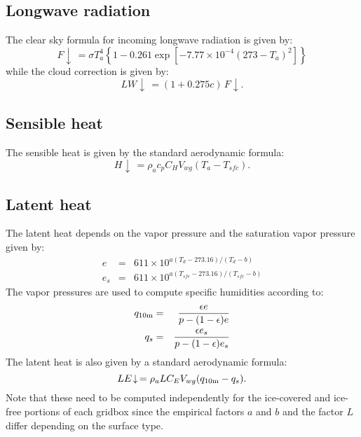 \subsection{Longwave radiation}

The clear sky formula for incoming longwave radiation is given by:
\begin{equation}
   F\!\downarrow\, = \sigma T_a^4 \left\{1 - 0.261 \exp \left[ -7.77 \times 10^{-4}
   (273 - T_a) ^2 \right] \right\}
\end{equation}
while the cloud correction is given by:
\begin{equation}
   LW\!\downarrow\, = (1 + 0.275 c)\, F\!\downarrow .
\end{equation}

\subsection{Sensible heat}

The sensible heat is given by the standard aerodynamic formula:
\begin{equation}
   H\!\downarrow\, = \rho_a c_p C_H V_{wg} (T_a - T_{s\!f\!c}) .
\end{equation}

\subsection{Latent heat}

The latent heat depends on the vapor pressure and the saturation vapor
pressure given by:
\begin{eqnarray}
   e & = & 611 \times 10^{a(T_d - 273.16) / (T_d - b)} \\
   e_s & = & 611 \times 10^{a(T_{s\!f\!c} - 273.16) / (T_{s\!f\!c} - b)}
\end{eqnarray}
The vapor pressures are used to compute specific humidities according
to:
\begin{eqnarray}
   q_{10 \rm m} & = & {\epsilon e \over p - (1 - \epsilon) e} \\
   q_s & = & {\epsilon e_s \over p - (1 - \epsilon) e_s}
\end{eqnarray}
The latent heat is also given by a standard aerodynamic formula:
\begin{equation}
   LE\!\downarrow\, = \rho_a L C_E V_{wg} (q_{10 \rm m} - q_s) .
\end{equation}
Note that these need to be computed independently for the ice-covered
and ice-free portions of each gridbox since the empirical factors
$a$ and $b$ and the factor $L$ differ depending on the surface type.
